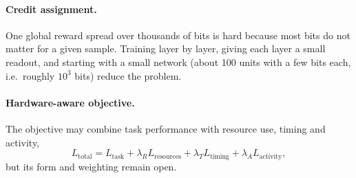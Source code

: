 \paragraph{Credit assignment.} One global reward spread over thousands of bits is hard because most bits do not matter for a given sample. Training layer by layer, giving each layer a small readout, and starting with a small network (about 100 units with a few bits each, i.e.\ roughly $10^3$ bits) reduce the problem.

\paragraph{Hardware-aware objective.} The objective may combine task performance with resource use, timing and activity,
\begin{equation}
L_{\text{total}} = L_{\text{task}} + \lambda_R L_{\text{resources}} + \lambda_T L_{\text{timing}} + \lambda_A L_{\text{activity}},
\end{equation}
but its form and weighting remain open.
